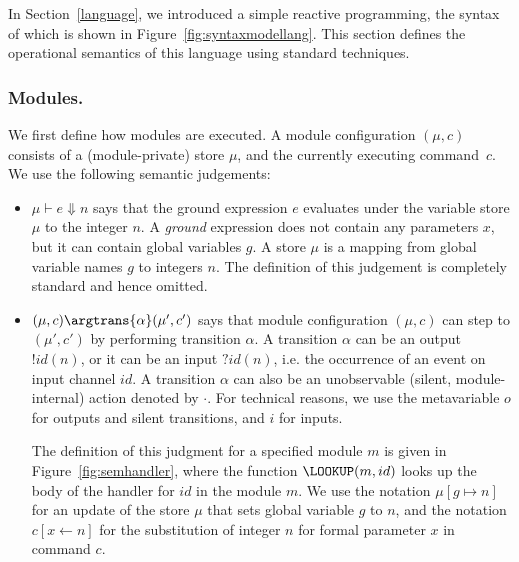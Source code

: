 In Section~\ref{language}, we introduced a simple reactive programming,
the syntax of which is shown in Figure~\ref{fig:syntaxmodellang}.  This
section defines the operational semantics of this language using standard
techniques.

\subsubsection{Modules.}
%
We first define how modules are executed.
A module configuration $(\mu, c)$ consists of a  (module-private) store $\mu$,  and the currently executing command~$c$.
%
We use the following semantic judgements:

\begin{itemize}
\item $\mu \vdash e \Downarrow n$ says that the ground expression $e$ evaluates under the variable store $\mu$ to the integer $n$. A {\em ground} expression does not contain
any parameters $x$, but it can contain global variables $g$. A store $\mu$ is a mapping from global variable names $g$ to integers $n$.
The definition of this judgement is completely standard and hence omitted.
\item $(\mu,c) \argtrans{\alpha}(\mu',c')$ says that module configuration $(\mu,c)$ can step to $(\mu',c')$ by performing transition $\alpha$.
A transition $\alpha$ can be an output $!id(n)$, or it can be an input $?id(n)$, i.e. the occurrence of an  event on input channel $id$.
A transition $\alpha$ can also be an unobservable (silent, module-internal) action denoted by $\cdot$. For technical reasons, we use the metavariable $o$ for outputs and silent
transitions, and $i$ for inputs.


The definition of this judgment for a specified module $m$ is given in Figure~\ref{fig:semhandler}, where the function $\LOOKUP(m,id)$ looks up the body of the handler for $id$ in the module $m$.
We use the notation $\mu[g \mapsto n]$ for an update of the store $\mu$ that sets global variable $g$ to $n$, and the notation $c[x\leftarrow n]$ for
the substitution of  integer $n$ for formal parameter $x$ in command $c$.
\end{itemize}

